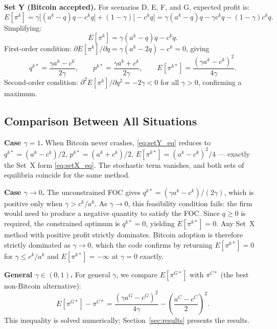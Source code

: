 \documentclass{article}
\begin{document}
\textbf{Set Y (Bitcoin accepted).}
For scenarios D, E, F, and G, expected profit is:
\begin{equation}
  E[\pi^k] = \gamma \bigl[(a^k - q)q - c^k q\bigr]
           + (1-\gamma)\bigl[-c^k q\bigr]
           = \gamma(a^k - q)q - \gamma c^k q - (1-\gamma)c^k q.
  \label{eq:setY_profit_raw}
\end{equation}
Simplifying:
\begin{equation}
  E[\pi^k] = \gamma(a^k - q)q - c^k q.
  \label{eq:setY_profit}
\end{equation}
First-order condition: $\partial E[\pi^k] / \partial q = \gamma(a^k - 2q) - c^k = 0$,
giving
\begin{equation}
  q^{k*} = \frac{\gamma a^k - c^k}{2\gamma}, \qquad
  p^{k*} = \frac{\gamma a^k + c^k}{2\gamma}, \qquad
  E[\pi^{k*}] = \frac{(\gamma a^k - c^k)^2}{4\gamma}.
  \label{eq:setY_eq}
\end{equation}
Second-order condition: $\partial^2 E[\pi^k] / \partial q^2 = -2\gamma < 0$ for
all $\gamma > 0$, confirming a maximum.

\subsection{Comparison Between All Situations}
\label{sec:comparison}

\textbf{Case $\gamma = 1$.}
When Bitcoin never crashes, \eqref{eq:setY_eq} reduces to
$q^{k*} = (a^k - c^k)/2$, $p^{k*} = (a^k + c^k)/2$,
$E[\pi^{k*}] = (a^k - c^k)^2/4$ --- exactly the Set~X form \eqref{eq:setX_eq}.
The stochastic term vanishes, and both sets of equilibria coincide for the same
method.

\textbf{Case $\gamma \to 0$.}
The unconstrained FOC gives $q^{k*} = (\gamma a^k - c^k)/(2\gamma)$, which is
positive only when $\gamma > c^k/a^k$.
As $\gamma \to 0$, this feasibility condition fails: the firm would need to
produce a negative quantity to satisfy the FOC.
Since $q \geq 0$ is required, the constrained optimum is $q^{k*} = 0$, yielding
$E[\pi^{k*}] = 0$.
Any Set~X method with positive profit strictly dominates.
Bitcoin adoption is therefore strictly dominated as $\gamma \to 0$,
which the code confirms by returning $E[\pi^{k*}] = 0$ for $\gamma \leq c^k/a^k$
and $E[\pi^{k*}] = -\infty$ at $\gamma = 0$ exactly.

\textbf{General $\gamma \in (0,1)$.}
For general $\gamma$, we compare $E[\pi^{G*}]$ with $\pi^{C*}$ (the best
non-Bitcoin alternative):
\begin{equation}
  E[\pi^{G*}] - \pi^{C*} =
    \frac{(\gamma a^G - c^G)^2}{4\gamma}
    - \left(\frac{a^C - c^C}{2}\right)^{\!2}.
  \label{eq:adoption_condition}
\end{equation}
This inequality is solved numerically; Section~\ref{sec:results} presents the
results.
\end{document}
